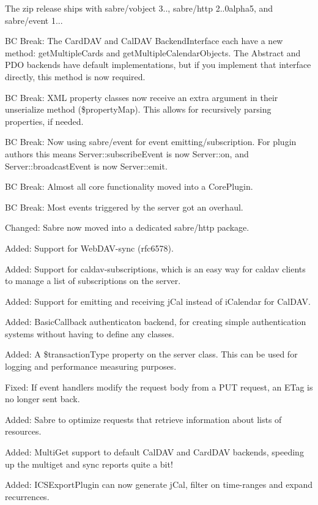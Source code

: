 \begin{DoxyItemize}
\item The zip release ships with sabre/vobject 3.., sabre/http 2..\+0alpha5, and sabre/event 1...
\item BC Break\+: The Card\+D\+AV and Cal\+D\+AV Backend\+Interface each have a new method\+: get\+Multiple\+Cards and get\+Multiple\+Calendar\+Objects. The Abstract and P\+DO backends have default implementations, but if you implement that interface directly, this method is now required.
\item BC Break\+: X\+ML property classes now receive an extra argument in their unserialize method (\$property\+Map). This allows for recursively parsing properties, if needed.
\item BC Break\+: Now using sabre/event for event emitting/subscription. For plugin authors this means Server\+::subscribe\+Event is now Server\+::on, and Server\+::broadcast\+Event is now Server\+::emit.
\item BC Break\+: Almost all core functionality moved into a Core\+Plugin.
\item BC Break\+: Most events triggered by the server got an overhaul.
\item Changed\+: Sabre now moved into a dedicated sabre/http package.
\item Added\+: Support for Web\+D\+A\+V-\/sync (rfc6578).
\item Added\+: Support for caldav-\/subscriptions, which is an easy way for caldav clients to manage a list of subscriptions on the server.
\item Added\+: Support for emitting and receiving j\+Cal instead of i\+Calendar for Cal\+D\+AV.
\item Added\+: Basic\+Callback authenticaton backend, for creating simple authentication systems without having to define any classes.
\item Added\+: A \$transaction\+Type property on the server class. This can be used for logging and performance measuring purposes.
\item Fixed\+: If event handlers modify the request body from a P\+UT request, an E\+Tag is no longer sent back.
\item Added\+: Sabre to optimize requests that retrieve information about lists of resources.
\item Added\+: Multi\+Get support to default Cal\+D\+AV and Card\+D\+AV backends, speeding up the multiget and sync reports quite a bit!
\item Added\+: I\+C\+S\+Export\+Plugin can now generate j\+Cal, filter on time-\/ranges and expand recurrences.

\end{DoxyItemize}
